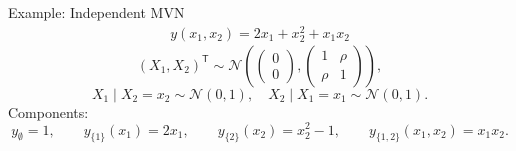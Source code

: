 \begin{frame}{Example: Independent MVN} %
  \begin{align*}
    y(x_1, x_2) = 2x_1 + x_2^{2} + x_1 x_2
  \end{align*}
\[
(X_1, X_2)^\mathsf{T} \sim \mathcal{N}\!\left(
\begin{pmatrix}0 \\ 0\end{pmatrix},
\begin{pmatrix}
1 & \rho \\ 
\rho & 1
\end{pmatrix}
\right),
\]
\[
X_1 \mid X_2=x_2 \sim \mathcal{N}(0, 1), \quad
X_2 \mid X_1=x_1 \sim \mathcal{N}(0, 1).
\]
Components:
\begin{equation*}
    y_{\emptyset} = 1, \qquad
    y_{\{1\}}(x_1) = 2x_1, \qquad
    y_{\{2\}}(x_2) = x_2^{2} - 1, \qquad
    y_{\{1,2\}}(x_1, x_2) = x_1 x_2.
\end{equation*}
\end{frame}


